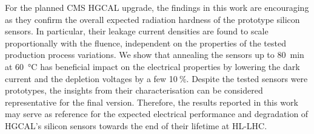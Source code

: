 For the planned CMS HGCAL upgrade, the findings in this work are encouraging as they confirm the overall expected radiation hardness of the prototype silicon sensors.
In particular, their leakage current densities are found to scale proportionally with the fluence, independent on the properties of the tested production process variations.
We show that annealing the sensors up to \SI{80}{\minute} at \SI{60}{\celsius} has beneficial impact on the electrical properties by lowering the dark current and the depletion voltages by a few 10$~\%$.
Despite the tested sensors were prototypes, the insights from their characterisation can be considered representative for the final version.
Therefore, the results reported in this work may serve as reference for the expected electrical performance and degradation of HGCAL's silicon sensors towards the end of their lifetime at HL-LHC.